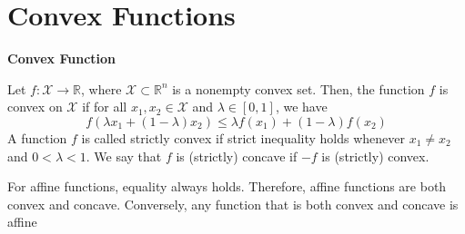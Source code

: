 \documentclass[english]{latex4ei_sheet}
\begin{document}
\section{Convex Functions}
\begin{sectionbox}
\textbf{Convex Function}
\begin{emphbox}
\begin{flushleft}
Let $f: \mathcal{X} \rightarrow \mathbb{R}$, where $\mathcal{X} \subset \mathbb{R}^{n}$ is a nonempty convex set. Then, the function $f$ is convex on $\mathcal{X}$ if for all $x_{1}, x_{2} \in \mathcal{X}$ and $\lambda \in[0,1]$, we have
$$
f\left(\lambda x_{1}+(1-\lambda) x_{2}\right) \leq \lambda f\left(x_{1}\right)+(1-\lambda) f\left(x_{2}\right)
$$
A function $f$ is called strictly convex if strict inequality holds whenever $x_{1} \neq x_{2}$ and $0<\lambda<1$. We say that $f$ is (strictly) concave if $-f$ is (strictly) convex.
\end{flushleft}
\end{emphbox}

For affine functions, equality always holds. Therefore, affine functions are both convex and concave. Conversely, any function that is both convex and concave is affine
\end{sectionbox}
\end{document}
